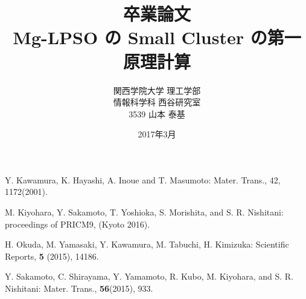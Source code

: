 \documentclass[12pt,a4]{jreport}%
\begin{document}
\title{卒業論文\\Mg-LPSO の Small Cluster の第一原理計算}
\author{関西学院大学 理工学部\\情報科学科 西谷研究室\\3539 山本 泰基}
\date{2017年3月}
\maketitle
\newpage



\tableofcontents



\begin{thebibliography}{9}
Y. Kawamura, K. Hayashi, A. Inoue and T. Masumoto: Mater. Trans., 42, 1172(2001).

 M. Kiyohara, Y. Sakamoto, T. Yoshioka, S. Morishita, and S. R. Nishitani: proceedings of PRICM9, (Kyoto 2016).

 H. Okuda, M. Yamasaki, Y. Kawamura, M. Tabuchi, H. Kimizuka: Scientific Reports, {\bf5} (2015), 14186.

Y. Sakamoto, C. Shirayama, Y. Yamamoto, R. Kubo, M. Kiyohara, and S. R. Nishitani: Mater. Trans., {\bf 56}(2015), 933.
\end{thebibliography}
\end{document}
